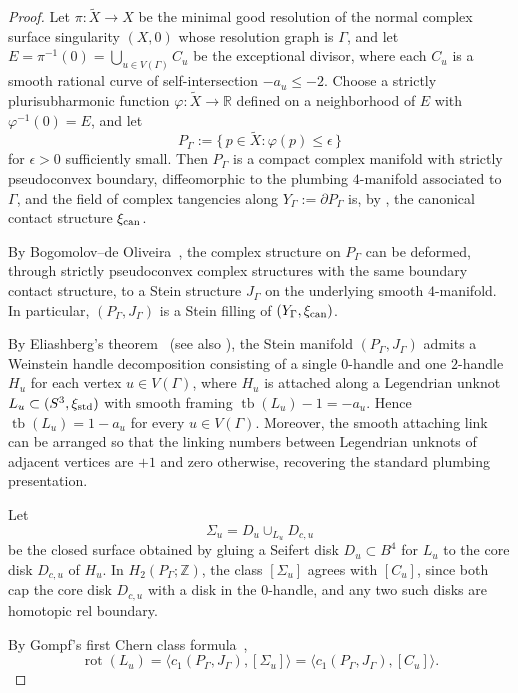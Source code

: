 \documentclass[11pt]{amsart}
\theoremstyle{plain}
\theoremstyle{definition}
\theoremstyle{remark}
\newcommand{\R}{\mathbb{R}}
\newcommand{\Z}{\mathbb{Z}}
\DeclareMathOperator\tb{tb}
\DeclareMathOperator\rot{rot}
\begin{document}
\begin{proof}
Let $\pi\colon\tilde X\to X$ be the minimal good resolution of the
normal complex surface singularity $(X,0)$ whose resolution graph is
$\Gamma$, and let $E=\pi^{-1}(0)=\bigcup_{u\in V(\Gamma)} C_u$ be the
exceptional divisor, where each $C_u$ is a smooth rational curve of
self-intersection $-a_u\le -2$. Choose a strictly plurisubharmonic
function $\varphi\colon\tilde X\to\R$ defined on a neighborhood of
$E$ with $\varphi^{-1}(0)=E$, and let
\[
P_\Gamma:=\{\,p\in\tilde X:\varphi(p)\le\epsilon\,\}
\]
for $\epsilon>0$ sufficiently small. Then $P_\Gamma$ is a compact
complex manifold with strictly pseudoconvex boundary, diffeomorphic
to the plumbing $4$-manifold associated to $\Gamma$, and the field
of complex tangencies along $Y_\Gamma:=\partial P_\Gamma$ is, by
\cite{CaubelNemethiPopescu-Pampu2006}, the canonical contact
structure $\xi_{\rm can}$.

By Bogomolov--de Oliveira~\cite{BogomolovDeOliveira97}, the complex
structure on $P_\Gamma$ can be deformed, through strictly
pseudoconvex complex structures with the same boundary contact
structure, to a Stein structure $J_\Gamma$ on the underlying smooth
$4$-manifold. In particular, $(P_\Gamma,J_\Gamma)$ is a Stein filling
of $(Y_\Gamma,\xi_{\rm can})$.

By Eliashberg's theorem~\cite{Eliashberg90a} (see also
\cite[Theorem~1.3]{Gompf98}), the Stein manifold $(P_\Gamma,J_\Gamma)$
admits a Weinstein handle decomposition consisting of a single
$0$-handle and one $2$-handle $H_u$ for each vertex $u\in V(\Gamma)$,
where $H_u$ is attached along a Legendrian unknot
$L_u\subset(S^3,\xi_{\rm std})$ with smooth framing
$\tb(L_u)-1=-a_u$. Hence $\tb(L_u)=1-a_u$ for every $u\in V(\Gamma)$.
Moreover, the smooth attaching link can be arranged so that the
linking numbers between Legendrian unknots of adjacent vertices are
$+1$ and zero otherwise, recovering the standard plumbing
presentation.

Let
\[
\Sigma_u=D_u\cup_{L_u} D_{c,u}
\]
be the closed surface obtained by gluing a Seifert disk
$D_u\subset B^4$ for $L_u$ to the core disk $D_{c,u}$ of $H_u$. In
$H_2(P_\Gamma;\Z)$, the class $[\Sigma_u]$ agrees with $[C_u]$, since
both cap the core disk $D_{c,u}$ with a disk in the $0$-handle, and
any two such disks are homotopic rel boundary.

By Gompf's first Chern class formula~\cite[Proposition~2.3]{Gompf98},
\[
\rot(L_u)
=\langle c_1(P_\Gamma,J_\Gamma),[\Sigma_u]\rangle
=\langle c_1(P_\Gamma,J_\Gamma),[C_u]\rangle.
\]


\end{proof}
\end{document}
